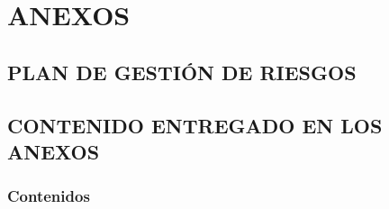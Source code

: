 \newpage
\chapter{ANEXOS}
\newpage
\section{PLAN DE GESTIÓN DE RIESGOS}

\newpage
\section{CONTENIDO ENTREGADO EN LOS ANEXOS}\label{sec:contenido_anexos}

\subsection{Contenidos} 



